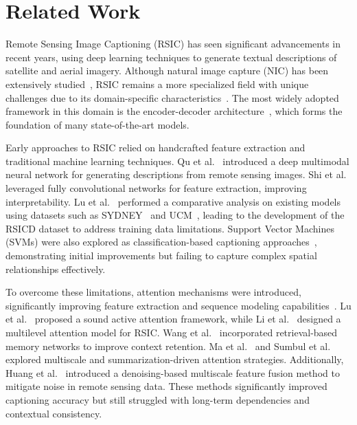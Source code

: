 \section{Related Work}
\label{sec:rel_work}
Remote Sensing Image Captioning (RSIC) has seen significant advancements in recent years, using deep learning techniques to generate textual descriptions of satellite and aerial imagery. Although natural image capture (NIC) has been extensively studied~\cite{you2016image,li2018multi,vinyals2015show}, RSIC remains a more specialized field with unique challenges due to its domain-specific characteristics~\cite{hoxha2020new,hoxha2021novel,qu2016deep}. The most widely adopted framework in this domain is the encoder-decoder architecture~\cite{qu2016deep,hoxha2021novel,hoxha2020new,lu2017exploring}, which forms the foundation of many state-of-the-art models.

Early approaches to RSIC relied on handcrafted feature extraction and traditional machine learning techniques. Qu et al.~\cite{qu2016deep} introduced a deep multimodal neural network for generating descriptions from remote sensing images. Shi et al.~\cite{shi2017can} leveraged fully convolutional networks for feature extraction, improving interpretability. Lu et al.~\cite{lu2017exploring} performed a comparative analysis on existing models using datasets such as SYDNEY~\cite{qu2016deep} and UCM~\cite{qu2016deep}, leading to the development of the RSICD dataset to address training data limitations. Support Vector Machines (SVMs) were also explored as classification-based captioning approaches~\cite{hoxha2021novel}, demonstrating initial improvements but failing to capture complex spatial relationships effectively.

To overcome these limitations, attention mechanisms were introduced, significantly improving feature extraction and sequence modeling capabilities~\cite{xu2015show}. Lu et al.~\cite{lu2019sound} proposed a sound active attention framework, while Li et al.~\cite{li2020multi} designed a multilevel attention model for RSIC. Wang et al.~\cite{wang2020retrieval} incorporated retrieval-based memory networks to improve context retention. Ma et al.~\cite{ma2020multiscale} and Sumbul et al.~\cite{sumbul2020sd} explored multiscale and summarization-driven attention strategies. Additionally, Huang et al.~\cite{huang2020denoising} introduced a denoising-based multiscale feature fusion method to mitigate noise in remote sensing data. These methods significantly improved captioning accuracy but still struggled with long-term dependencies and contextual consistency.

